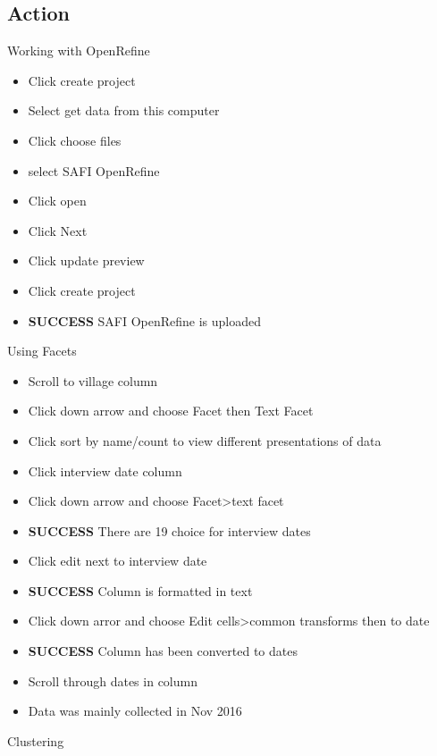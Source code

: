 \documentclass{article}
\begin{document}
\subsection{Action}
Working with OpenRefine
\begin{itemize}
\item Click create project
\item Select get data from this computer
\item Click choose files
\item select SAFI OpenRefine 
\item Click open
\item Click Next 
\item Click update preview
\item Click create project
\item \textbf{SUCCESS} SAFI OpenRefine is uploaded \\
\end{itemize}
Using Facets
\begin{itemize}
\item Scroll to village column
\item Click down arrow and choose Facet then Text Facet
\item Click sort by name/count to view different presentations of data
\item Click interview date column
\item Click down arrow and choose Facet>text facet
\item \textbf{SUCCESS} There are 19 choice for interview dates
\item Click edit next to interview date
\item \textbf{SUCCESS} Column is formatted in text
\item Click down arror and choose Edit cells>common transforms then to date
\item \textbf{SUCCESS} Column has been converted to dates
\item Scroll through dates in column
\item Data was mainly collected in Nov 2016
\end{itemize}
Clustering
\end{document}
